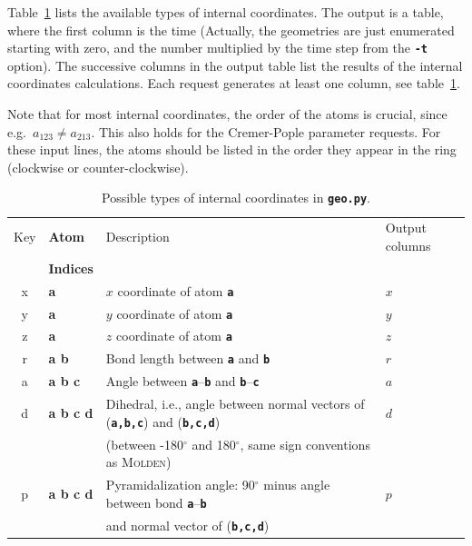 \documentclass[a4paper,10pt,DIV=15,openany]{scrbook}
\newcommand{\ttt}[1]{\textbf{\texttt{#1}}}
\begin{document}
Table~\ref{tab:Geo_input} lists the available types of internal coordinates. The output is a table, where the first column is the time (Actually, the geometries are just enumerated starting with zero, and the number multiplied by the time step from the \ttt{-t} option). The successive columns in the output table list the results of the internal coordinates calculations. Each request generates at least one column, see table~\ref{tab:Geo_input}. 

Note that for most internal coordinates, the order of the atoms is crucial, since e.g.\ $a_{123}\neq a_{213}$. This also holds for the Cremer-Pople parameter requests. For these input lines, the atoms should be listed in the order they appear in the ring (clockwise or counter-clockwise).

\begin{table}[htb]
  \centering
  \caption{Possible types of internal coordinates in \ttt{geo.py}. }
  \label{tab:Geo_input}
  \begin{tabular}{>{\ttfamily}c>{\bfseries\ttfamily}lll}
    \hline
    \rmfamily Key         &\normalfont\rmfamily Atom      &Description    &Output columns\\
                          &\normalfont\rmfamily Indices   &               &\\
    \hline
    x   &a              &$x$ coordinate of atom \ttt{a}                                         &$x$\\
    y   &a              &$y$ coordinate of atom \ttt{a}                                         &$y$\\
    z   &a              &$z$ coordinate of atom \ttt{a}                                         &$z$\\
    r   &a b            &Bond length between \ttt{a} and \ttt{b}                                &$r$\\
    a   &a b c          &Angle between \ttt{a}--\ttt{b} and \ttt{b}--\ttt{c}                    &$a$\\
    d   &a b c d        &Dihedral, i.e., angle between normal vectors of (\ttt{a,b,c}) and (\ttt{b,c,d})   &$d$\\
                       &&(between -180$^\circ$ and 180$^\circ$, same sign conventions as \textsc{Molden})\\
    p   &a b c d        &Pyramidalization angle: 90$^\circ$ minus angle between bond \ttt{a}--\ttt{b}   &$p$\\
                       &&and normal vector of (\ttt{b,c,d})&\\

\end{tabular}
\end{table}
\end{document}
